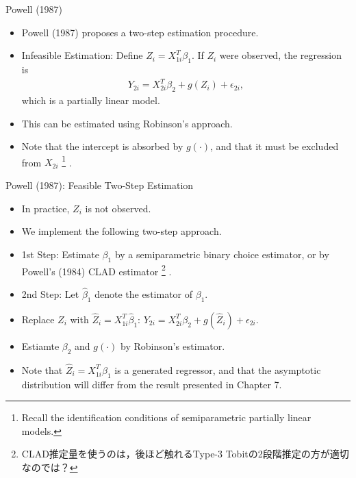 \documentclass[xcolor=svgnames,dvipdfmx,cjk]{beamer}
\theoremstyle{example}
\begin{document}
\begin{frame}{Powell (1987)}
      \begin{itemize}
            \item Powell (1987) proposes a two-step estimation procedure.
            \item \alert{Infeasible Estimation}: Define $Z_i = X_{1i}^T \beta_1$. If $Z_i$ were observed, the regression is 
                  \begin{align*}
                        Y_{2i} = X_{2i}^T \beta_2 + g(Z_i) + \epsilon_{2i},
                  \end{align*}
                  which is a partially linear model. 
            \item This can be estimated using Robinson's approach.
            \item Note that the intercept is absorbed by $g(\cdot)$, 
                  and that it must be excluded from $X_{2i}$
                  \footnote{Recall the identification conditions of semiparametric partially linear models.}
                  .
      \end{itemize}
\end{frame}

\begin{frame}{Powell (1987): Feasible Two-Step Estimation}
      \begin{itemize}
            \item In practice, $Z_i$ is not observed. 
            \item We implement the following two-step approach.
            \item \alert{1st Step}: Estimate $\beta_1$ 
                  by a semiparametric binary choice estimator, 
                  or by Powell's (1984) CLAD estimator
                  \footnote{CLAD推定量を使うのは，後ほど触れるType-3 Tobitの2段階推定の方が適切なのでは？}
                  .
            \item \alert{2nd Step}: Let $\hat{\beta}_1$ denote the estimator of $\beta_1$.
            \item Replace $Z_i$ with $\hat{Z}_i = X_{1i}^T \hat{\beta}_1$: $ Y_{2i} = X_{2i}^T \beta_2 + g(\hat{Z}_i) + \epsilon_{2i}$.
            \item Estiamte $\beta_2$ and $g(\cdot)$ by Robinson's estimator.
            \item Note that $\hat{Z}_i = X_{1i}^T \hat{\beta}_1$ is a generated regressor, 
                  and that the asymptotic distribution will differ from the result presented in Chapter 7.
      \end{itemize}
\end{frame}
\end{document}
